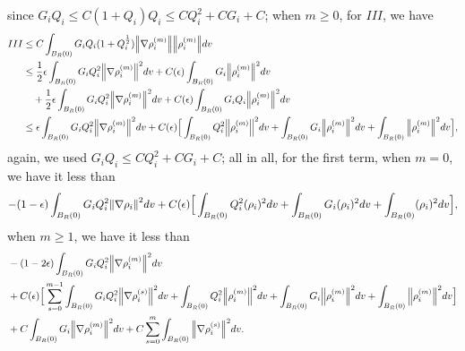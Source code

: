 \documentclass[a4paper, 11pt]{article}
\theoremstyle{plain}
\theoremstyle{remark}
\theoremstyle{definition}
\newcommand{\intr}{\int_{B_R(0)}}
\newcommand{\Q}{Q}
\begin{document}
    since $G_iQ_i\leq C(1+Q_i)Q_i\leq CQ_i^2+CG_i+C$;
	when $m\geq 0$, for $III$, we have
	\begin{equation}
		\begin{aligned}
			III&\leq C\intr G_iQ_i(1+Q_i^{\frac{1}{2}})\norm{\nabla\rho_i^{(m)}}\norm{\rho_i^{(m)}}dv\\
            &\leq \frac{1}{2}\epsilon\intr G_i\Q_i^2\norm{\nabla\rho_i^{(m)}}^2dv+C(\epsilon)\intr G_i\norm{\rho_i^{(m)}}^2dv\\
            &\quad+\frac{1}{2}\epsilon\intr G_i\Q_i^2\norm{\nabla\rho_i^{(m)}}^2dv+C(\epsilon)\intr G_iQ_i\norm{\rho_i^{(m)}}^2dv \\
            &\leq \epsilon\intr G_i\Q_i^2\norm{\nabla\rho_i^{(m)}}^2dv+C(\epsilon)\Big[\intr Q_i^2\norm{\rho_i^{(m)}}^2dv+\intr G_i\norm{\rho_i^{(m)}}^2dv+\intr \norm{\rho_i^{(m)}}^2dv\Big],
		\end{aligned}
	\end{equation}
    again, we used $G_iQ_i\leq CQ_i^2+CG_i+C$; all in all, for the first term, when $m=0$, we have it less than
	\begin{equation}
		\begin{aligned}
			-(1-\epsilon)\intr G_i\Q_i^2\norm{\nabla\rho_i}^2dv+C(\epsilon)\Big[\intr \Q_i^2(\rho_i)^2dv+\intr G_i(\rho_i)^2dv+\intr(\rho_i)^2dv\Big],
		\end{aligned}
	\end{equation}
	when $m\geq 1$, we have it less than
	\begin{equation}
		\begin{aligned}
			&-(1-2\epsilon)\intr G_i\Q_i^2\norm{\nabla\rho_i^{(m)}}^2dv\\
			&+C(\epsilon)\Big[\sum_{s=0}^{m-1}\intr G_i\Q_i^2\norm{\nabla\rho_i^{(s)}}^2dv+\intr Q_i^2\norm{\rho_i^{(m)}}^2dv+\intr G_i\norm{\rho_i^{(m)}}^2dv+\intr \norm{\rho_i^{(m)}}^2dv\Big]\\
            &+C\intr G_i\norm{\nabla\rho_i^{(m)}}^2dv+C\sum_{s=0}^m\intr\norm{\nabla\rho_i^{(s)}}^2dv.
		\end{aligned}
	\end{equation}
	
\end{document}

